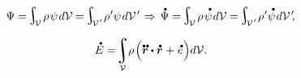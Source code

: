 \nopagebreak\en{\vspace{-0.6em}}\ru{\vspace{-0.3em}}\begin{equation*}
\Psi = \hspace{-0.25ex}\scalebox{1.4}{$\integral$}_{\hspace{-0.5ex}\raisemath{-0.05em}{\mathcal{V}}} \hspace{.3ex} \rho \hspace{.2ex} \psi \hspace{.2ex} d\mathcal{V} \hspace{-0.1ex}
= \hspace{-0.2ex} \scalebox{1.4}{$\integral$}_{\hspace{-0.5ex}\raisemath{-0.05em}{\mathcal{V}\hspace{.12ex}'}} \hspace{.2ex} \rho \hspace{.1ex}' \psi \hspace{.2ex} d\mathcal{V}\hspace{.2ex}'
\hspace{.2ex} \Rightarrow \hspace{.33ex}
\mathdotabove{\Psi} = \hspace{-0.25ex}\scalebox{1.4}{$\integral$}_{\hspace{-0.5ex}\raisemath{-0.05em}{\mathcal{V}}} \hspace{.3ex} \rho \hspace{.2ex} \mathdotabove{\psi} \hspace{.2ex} d\mathcal{V} \hspace{-0.1ex}
= \hspace{-0.2ex} \scalebox{1.4}{$\integral$}_{\hspace{-0.5ex}\raisemath{-0.05em}{\mathcal{V}\hspace{.12ex}'}} \hspace{.2ex} \rho \hspace{.1ex}' \mathdotabove{\psi} \hspace{.2ex} d\mathcal{V}\hspace{.2ex}'\hspace{-0.5ex} ,
\end{equation*}

\vspace{-0.1em}\noindent
{} 

\nopagebreak\vspace{-0.2em}\begin{equation}\label{rateofinternalenergychange}
\mathdotabove{E} = \hspace{-0.44ex} \integral\displaylimits_{\mathcal{V}} \hspace{-0.5ex} \rho \hspace{.2ex} \Bigl(
\mathdotdotabove{\currentlocationvector} \dotp \mathdotabove{\currentlocationvector} \hspace{.1ex}
+ \hspace{.1ex} \mathdotabove{e} \hspace{.1ex}
\Bigr) d\mathcal{V} .
\end{equation}

